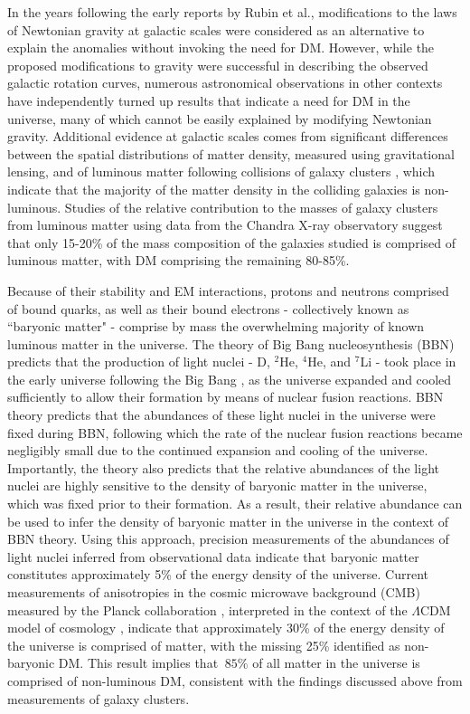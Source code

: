 In the years following the early reports by Rubin et al., modifications to the laws of Newtonian gravity at galactic scales \cite{mond_1983} were considered as an alternative to explain the anomalies without invoking the need for DM. However, while the proposed modifications to gravity were successful in describing the observed galactic rotation curves, numerous astronomical observations in other contexts have independently turned up results that indicate a need for DM in the universe, many of which cannot be easily explained by modifying Newtonian gravity. Additional evidence at galactic scales comes from significant differences between the spatial distributions of matter density, measured using gravitational lensing, and of luminous matter following collisions of galaxy clusters \cite{bullet_1995}, which indicate that the majority of the matter density in the colliding galaxies is non-luminous. Studies of the relative contribution to the masses of galaxy clusters from luminous matter using data from the Chandra X-ray observatory \cite{Chandra_2013} suggest that only 15-20\% of the mass composition of the galaxies studied is comprised of luminous matter, with DM comprising the remaining 80-85\%.

Because of their stability and EM interactions, protons and neutrons comprised of bound quarks, as well as their bound electrons - collectively known as ``baryonic matter" - comprise by mass the overwhelming majority of known luminous matter in the universe. The theory of Big Bang nucleosynthesis (BBN) \cite{pdg_2018} predicts that the production of light nuclei - D, \(^2\)He, \(^4\)He, and \(^7\)Li - took place in the early universe following the Big Bang \cite{uzan2016bigbang}, as the universe expanded and cooled sufficiently to allow their formation by means of nuclear fusion reactions. BBN theory predicts that the abundances of these light nuclei in the universe were fixed during BBN, following which the rate of the nuclear fusion reactions became negligibly small due to the continued expansion and cooling of the universe. Importantly, the theory also predicts that the relative abundances of the light nuclei are highly sensitive to the density of baryonic matter in the universe, which was fixed prior to their formation. As a result, their relative abundance can be used to infer the density of baryonic matter in the universe in the context of BBN theory. Using this approach, precision measurements of the abundances of light nuclei inferred from observational data indicate that baryonic matter constitutes approximately 5\% \cite{pdg_2018} of the energy density of the universe. Current measurements of anisotropies in the cosmic microwave background (CMB) \cite{cmb_1965} measured by the Planck collaboration \cite{Planck_2020}, interpreted in the context of the \(\Lambda\)CDM model of cosmology \cite{pdg_2018}, indicate that approximately 30\% of the energy density of the universe is comprised of matter, with the missing 25\% identified as non-baryonic DM. This result implies that \(~85\%\) of all matter in the universe is comprised of non-luminous DM, consistent with the findings discussed above from measurements of galaxy clusters.

